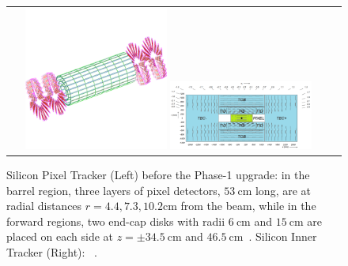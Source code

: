 \begin{figure}[!h]
  \begin{center}
    \begin{tabular}{cc}
        \includegraphics[width=0.45\textwidth]{fig_LHC_CMS/Pixel_Detector.pdf}
        \includegraphics[width=0.45\textwidth]{fig_LHC_CMS/Inner_Tracker.png}
    \end{tabular}
    \caption{Silicon Pixel Tracker (Left) before the Phase-1 upgrade: in the barrel region, three layers of pixel detectors, $\SI{53}{\cm}$ long, are at radial distances $r = 4.4, 7.3, 10.2 \si{\cm}$ from the beam, while in the forward regions, two end-cap disks with radii $\SI{6}{\cm}$ and $\SI{15}{\cm}$ are placed on each side at $z = \pm \SI{34.5}{\cm}$ and $\SI{46.5}{\cm}$~\cite{Bayatian:922757}.
            Silicon Inner Tracker (Right): ~\cite{Chatrchyan:1129810}.
            }
    \label{Inner_Tracker}
  \end{center}
\end{figure}

